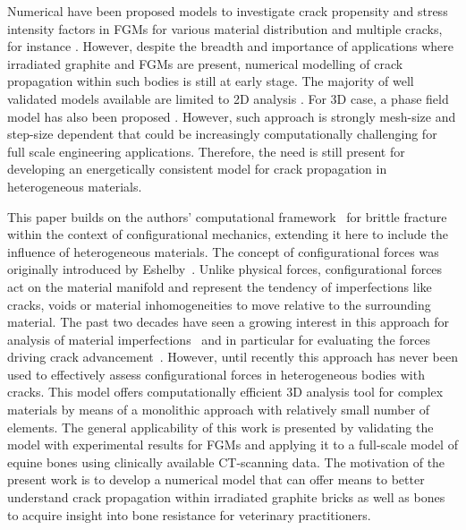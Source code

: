 \documentclass[onecolumn]{svjour3}
\begin{document}
Numerical have been proposed models to investigate crack propensity and stress intensity factors in FGMs for various material distribution and multiple cracks,
for instance \cite{KimPaulino2002, Ayhan2009, ZhangBEM2011, ShiMan2014, ShojaeeDaneshmand2015}.
However, despite the breadth and importance of applications where irradiated graphite and FGMs are present, 
numerical modelling of crack propagation within such bodies is still at early stage.
The majority of well validated models available are limited to 2D analysis \cite{KimPaulino2004,Bayesteh2013, Ooi2015, Chafi2019}.
For 3D case, a phase field model has also been proposed \cite{Hirshikesh2019}.
However, such approach is strongly mesh-size and step-size dependent that could be increasingly computationally challenging for full scale engineering applications.
Therefore, the need is still present for developing an energetically consistent model for crack propagation in heterogeneous materials.

This paper builds on the authors' computational framework~\cite{kaczmarczyk2017energy} for brittle fracture within the context of configurational mechanics, extending it here to include the influence of heterogeneous materials.
The concept of configurational forces was originally introduced by Eshelby~\cite{eshelby1951force}. 
Unlike physical forces, configurational forces act on the material manifold and represent the tendency of imperfections like cracks, voids or material inhomogeneities to move relative to the surrounding material. 
The past two decades have seen a growing interest in this approach for analysis of material imperfections~\cite{maugin2016configurational} and in particular for evaluating the forces driving crack advancement~\cite{kaczmarczyk2017energy,steinmann2001application, ozencc2016configurational}. 
However, until recently this approach has never been used to effectively assess configurational forces in heterogeneous bodies with cracks. 
This model offers computationally efficient 3D analysis tool for complex materials by means of a monolithic approach with relatively small number of elements.
The general applicability of this work is presented by validating the model with experimental results for FGMs and applying it to a full-scale model of equine bones using clinically available CT-scanning data.
The motivation of the present work is to develop a numerical model that can offer means to better understand crack propagation within irradiated graphite bricks as well as bones to acquire insight into bone resistance for veterinary practitioners.
\end{document}
